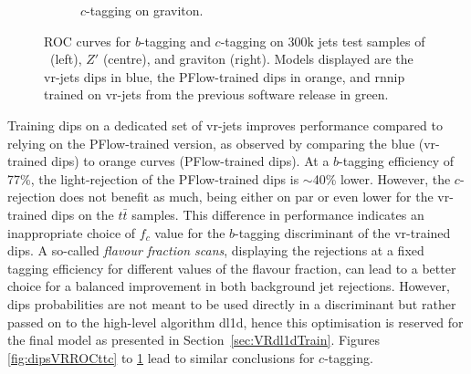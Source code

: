 \begin{figure}
\begin{subfigure}[t]{0.32\textwidth}
    \caption{$c$-tagging on graviton.}
    \label{fig:dipsVRROCgrc}
  \end{subfigure}
  \vspace{-0.15cm}
  \caption{ROC curves for $b$-tagging and $c$-tagging on 300k jets test samples of \ttb\ (left), $Z'$ (centre), and graviton (right). Models displayed are the \gls{vr}-jets \gls{dips} in blue, the PFlow-trained \gls{dips} in orange, and \gls{rnnip} trained on \gls{vr}-jets from the previous software release in green.}
  \label{fig:dipsVRROC}
\end{figure}

Training \gls{dips} on a dedicated set of \gls{vr}-jets improves performance compared to relying on the PFlow-trained version, as observed by comparing the blue (\gls{vr}-trained \gls{dips}) to orange curves (PFlow-trained \gls{dips}). At a $b$-tagging efficiency of 77\%, the light-rejection of the PFlow-trained \gls{dips} is $\sim$40\% lower. However, the $c$-rejection does not benefit as much, being either on par or even lower for the \gls{vr}-trained \gls{dips} on the $t\bar{t}$ samples. This difference in performance indicates an inappropriate choice of $f_c$ value for the $b$-tagging discriminant of the \gls{vr}-trained \gls{dips}. A so-called \textit{flavour fraction scans}, displaying the rejections at a fixed tagging efficiency for different values of the flavour fraction, can lead to a better choice for a balanced improvement in both background jet rejections. However, \gls{dips} probabilities are not meant to be used directly in a discriminant but rather passed on to the high-level algorithm \gls{dl1d}, hence this optimisation is reserved for the final model as presented in Section~\ref{sec:VRdl1dTrain}. Figures \ref{fig:dipsVRROCttc} to \ref{fig:dipsVRROCgrc} lead to similar conclusions for $c$-tagging.

